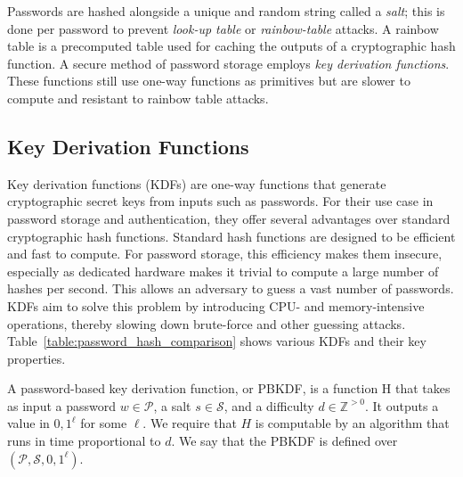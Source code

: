 Passwords are hashed alongside a unique and random string called a \textit{salt}; this is done per password to prevent \textit{look-up table} or \textit{rainbow-table} attacks. A rainbow table is a precomputed table used for caching the outputs of a cryptographic hash function. A secure method of password storage employs \textit{key derivation functions}. These functions still use one-way functions as primitives but are slower to compute and resistant to rainbow table attacks.

\subsection{Key Derivation Functions}

Key derivation functions (KDFs) are one-way functions that generate cryptographic secret keys from inputs such as passwords. For their use case in password storage and authentication, they offer several advantages over standard cryptographic hash functions. Standard hash functions are designed to be efficient and fast to compute. For password storage, this efficiency makes them insecure, especially as dedicated hardware makes it trivial to compute a large number of hashes per second. This allows an adversary to guess a vast number of passwords. KDFs aim to solve this problem by introducing CPU- and memory-intensive operations, thereby slowing down brute-force and other guessing attacks. Table~\ref{table:password_hash_comparison} shows various KDFs and their key properties.


\begin{definition}
    A password-based key derivation function, or PBKDF, is a function H that takes as input a password $w \in \mathcal{P}$, a salt $s \in \mathcal{S}$, and a difficulty $d \in \mathbb{Z}^{>0}$. It outputs a value in ${0,1}^\ell$ for some $\ell$. We require that $H$ is computable by an algorithm that runs in time proportional to $d$. We say that the PBKDF is defined over $(\mathcal{P}, \mathcal{S}, {0,1}^\ell)$.
\end{definition}

